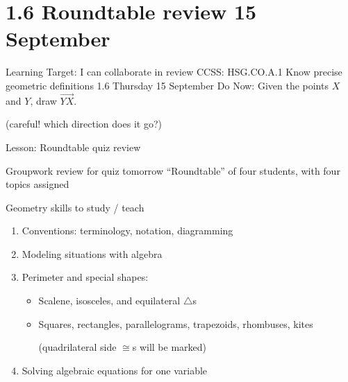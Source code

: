 \section{1.6 Roundtable review \hfill 15 September}
\begin{frame}{Learning Target: I can collaborate in review}
  {CCSS: HSG.CO.A.1 Know precise geometric definitions  \hfill \alert{1.6 Thursday 15 September}}
  Do Now: Given the points $X$ and $Y$, draw $\overrightarrow{YX}$. \par \bigskip
  (careful! which direction does it go?) 
  \vspace{1cm}
  \begin{center}
  \end{center} \vspace{1cm}
  Lesson: Roundtable quiz review
\end{frame}

\begin{frame}{Groupwork review for \alert{quiz tomorrow}}
  {``Roundtable'' of four students, with four topics assigned}
  \begin{block}{Geometry skills to study / teach}
      \begin{enumerate}
    \item Conventions: terminology, notation, diagramming
    \item Modeling situations with algebra
    \item Perimeter and special shapes: 
    \begin{itemize}
      \item Scalene, isosceles, and equilateral $\triangle$s
      \item Squares, rectangles, parallelograms, trapezoids, rhombuses, kites \par 
      (quadrilateral side $\cong$s will be marked)
    \end{itemize}
    \item Solving algebraic equations for one variable
  \end{enumerate}
  \end{block}
  \end{frame}

